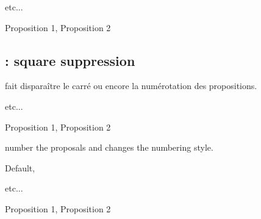 \begin{minipage}[c][][t]{.45\linewidth}
\begin{tkzexample}
  \begin{alterqcm}[lq=3cm,tone=titre n°1,ttwo=titre n°2]
  etc...
  \end{alterqcm}\end{tkzexample}
\end{minipage}\hfill
\begin{minipage}[c][][t]{.45\linewidth}
  \begin{alterqcm}[lq = 3cm,tone = titre n°1,ttwo = titre n°2]
  {{Proposition 1},
   {Proposition 2}
  }
  \end{alterqcm}
\end{minipage}

\subsection{ : square suppression }

 fait disparaître le carré ou encore la numérotation des propositions.

\begin{minipage}[c][][t]{.45\linewidth}
\begin{tkzexample}
  \begin{alterqcm}[lq=3cm,nosquare=true]
  etc...
  \end{alterqcm}\end{tkzexample}
\end{minipage}\hfill
\begin{minipage}[c][][t]{.45\linewidth}
  \begin{alterqcm}[lq=3cm,nosquare=true]
  {%
  {Proposition 1},
  {Proposition 2}
  }
  \end{alterqcm}
\end{minipage}

\medskip
{} number the proposals and  changes the numbering style.

Default, 

\begin{minipage}[c][][t]{.45\linewidth}
\begin{tkzexample}
  \begin{alterqcm}[lq=3cm,numprop   = true,propstyle = \Roman]
  etc...
  \end{alterqcm}\end{tkzexample}
\end{minipage}\hfill
\begin{minipage}[c][][t]{.45\linewidth}
  \begin{alterqcm}%
  [lq=3cm,
   numprop   = true,
   propstyle = \Roman]
  {%
  {Proposition 1},
  {Proposition 2}%
  }
  \end{alterqcm}
\end{minipage}

